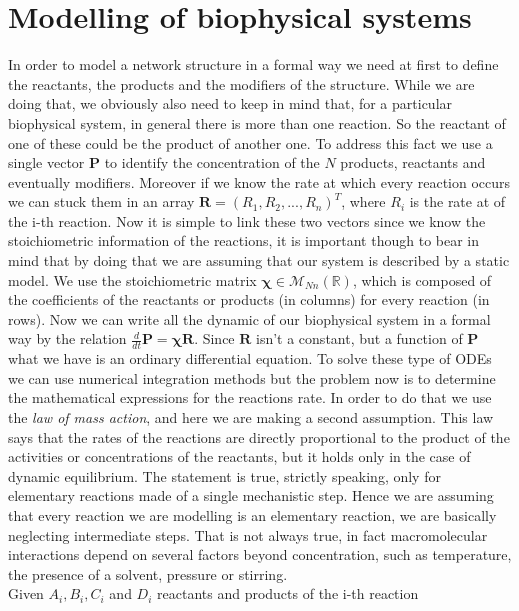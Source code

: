 \documentclass[pdf, color,12pt]{CITnote}
\begin{document}
\section{\large Modelling of biophysical systems}
In order to model a network structure in a formal way we need at first to define the reactants, the products and the modifiers of the structure. While we are doing that, we obviously also need to keep in mind that, for a particular biophysical system, in general there is more than one reaction. So the reactant of one of these could be the product of another one. To address this fact we use a single vector $\textbf{P}$ to identify the concentration of the $N$ products, reactants and eventually modifiers. Moreover if we know the rate at which every reaction occurs we can stuck them in an array $\textbf{R}=(R_1, R_2, ..., R_n)^T$, where $R_i$ is the rate at of the i-th reaction. Now it is simple to link these two vectors since we know the stoichiometric information of the reactions, it is important though to bear in mind that by doing that we are assuming that our system is described by a static model. We use the stoichiometric matrix $\mathbold{\chi} \in \mathcal{M}_{Nn}(\mathbb{R})$, which is composed of the coefficients of the reactants or products (in columns) for every reaction (in rows). Now we can write all the dynamic of our biophysical system in a formal way by the relation $\frac{d}{dt}\textbf{P}=\mathbold{\chi}\textbf{R}$. Since $\textbf{R}$ isn't a constant, but a function of $\textbf{P}$ what we have is an ordinary differential equation. To solve these type of ODEs we can use numerical integration methods but the problem now is to determine the mathematical expressions for the reactions rate.
\newline
In order to do that we use the \textit{law of mass action}, and here we are making a second assumption. This law says that the rates of the reactions are directly proportional to the product of the activities or concentrations of the reactants, but it holds only in the case of dynamic equilibrium. The statement is true, strictly speaking, only for elementary reactions made of a single mechanistic step. Hence we are assuming that every reaction we are modelling is an elementary reaction, we are basically neglecting intermediate steps. That is not always true, in fact macromolecular interactions depend on several factors beyond concentration, such as temperature, the presence of a solvent, pressure or stirring.
\\ Given $A_i, B_i, C_i$ and $D_i$ reactants and products of the i-th reaction
\end{document}
